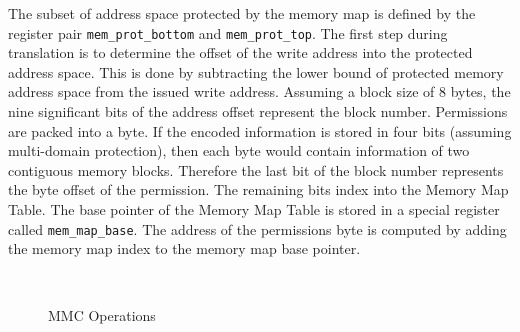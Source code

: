 The subset of address space protected by the memory map is defined by the register pair \texttt{mem\_prot\_bottom} and \texttt{mem\_prot\_top}.
%
The first step during translation is to determine the offset of the write address into the protected address space.
%
This is done by subtracting the lower bound of protected memory address space from the issued write address. 
%
Assuming a block size of 8 bytes, the nine significant bits of the address offset represent the block number.
%
Permissions are packed into a byte.
%
If the encoded information is stored in four bits (assuming multi-domain protection), then each byte would contain information of two contiguous memory blocks.
%
Therefore the last bit of the block number represents the byte offset of the permission.
%
The remaining bits index into the Memory Map Table.
%
The base pointer of the Memory Map Table is stored in a special register called \texttt{mem\_map\_base}.
%
The address of the permissions byte is computed by adding the memory map index to the memory map base pointer.
%
%
\begin{figure}[t]
  \centering
    \mbox{
      \quad
    }
    \caption{MMC Operations}
    \label{fig:mmc}
\end{figure}

